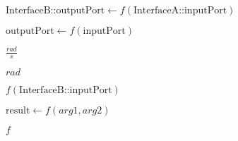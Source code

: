 \documentclass{article}
\begin{document}
$ \text{InterfaceB::outputPort} \leftarrow \mathit{f}(\text{InterfaceA::inputPort}) $
\pagebreak

$ \text{outputPort} \leftarrow \mathit{f}(\text{inputPort}) $
\pagebreak

$ \frac{rad}{s} $
\pagebreak

$ rad$
\pagebreak

$ \mathit{f}(\text{InterfaceB::inputPort}) $
\pagebreak

$ \text{result} \leftarrow \mathit{f}(arg1, arg2) $
\pagebreak

$ \mathit{f} $
\pagebreak
\end{document}
